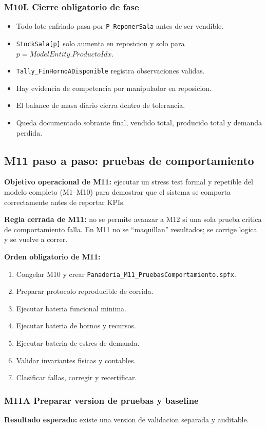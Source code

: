 \documentclass[11pt]{article}
\newcommand{\simio}[1]{\texttt{#1}}
\newcommand{\state}[1]{\texttt{#1}}
\newcommand{\proc}[1]{\texttt{#1}}
\begin{document}
\subsubsection{M10L Cierre obligatorio de fase}
\begin{itemize}
  \item Todo lote enfriado pasa por \proc{P\_ReponerSala} antes de ser vendible.
  \item \state{StockSala[p]} solo aumenta en reposicion y solo para \(p = ModelEntity.ProductoIdx\).
  \item \simio{Tally\_FinHornoADisponible} registra observaciones validas.
  \item Hay evidencia de competencia por manipulador en reposicion.
  \item El balance de masa diario cierra dentro de tolerancia.
  \item Queda documentado sobrante final, vendido total, producido total y demanda perdida.
\end{itemize}

\subsection{M11 paso a paso: pruebas de comportamiento}
\textbf{Objetivo operacional de M11:} ejecutar un stress test formal y repetible del modelo completo (M1--M10) para demostrar que el sistema se comporta correctamente antes de reportar KPIs.

\textbf{Regla cerrada de M11:} no se permite avanzar a M12 si una sola prueba critica de comportamiento falla. En M11 no se ``maquillan'' resultados; se corrige logica y se vuelve a correr.

\textbf{Orden obligatorio de M11:}
\begin{enumerate}
  \item Congelar M10 y crear \simio{Panaderia\_M11\_PruebasComportamiento.spfx}.
  \item Preparar protocolo reproducible de corrida.
  \item Ejecutar bateria funcional minima.
  \item Ejecutar bateria de hornos y recursos.
  \item Ejecutar bateria de estres de demanda.
  \item Validar invariantes fisicas y contables.
  \item Clasificar fallas, corregir y recertificar.
\end{enumerate}

\subsubsection{M11A Preparar version de pruebas y baseline}
\textbf{Resultado esperado:} existe una version de validacion separada y auditable.
\end{document}
